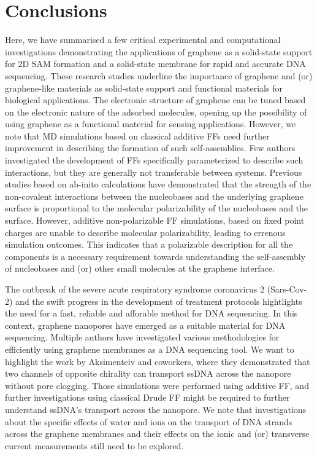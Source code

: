 \section{Conclusions}
Here, we have summarised a few critical experimental and computational investigations demonstrating the applications of graphene as a solid-state support for 2D SAM formation and a solid-state membrane for rapid and accurate DNA sequencing. These research studies underline the importance of graphene and (or) graphene-like materials as solid-state support and functional materials for biological applications. The electronic structure of graphene can be tuned based on the electronic nature of the adsorbed molecules, opening up the possibility of using graphene as a functional material for sensing applications. However, we note that MD simulations based on classical additive FFs need further improvement in describing the formation of such self-assemblies\supercite{saikia_hierarchical_2017,saikia_dynamics_2018}. Few authors investigated the development of FFs specifically parameterized to describe such interactions, but they are generally not transferable between systems\supercite{manukyan_first_2015}. Previous studies based on ab-inito calculations have demonstrated that the strength of the non-covalent interactions between the nucleobases and the underlying graphene surface is proportional to the molecular polarizability of the nucleobases and the surface.\supercite{gowtham_physisorption_2007} However, additive non-polarizable FF simulations, based on fixed point charges are unable to describe molecular polarizability, leading to errenous simulation outcomes. This indicates that a polarizable description for all the components is a necessary requirement towards understanding the self-assembly of nucleobases and (or) other small molecules at the graphene interface.  

The outbreak of the severe acute respiratory syndrome coronavirus 2 (Sars-Cov-2) and the swift progress in the development of treatment protocols hightlights the need for a fast, reliable and afforable method for DNA sequencing. In this context, graphene nanopores have emerged as a suitable material for DNA sequencing. Multiple authors have investigated various methodologies for efficiently using graphene membranes as a DNA sequencing tool. We want to highlight the work by Aksimenteiv and coworkers, where they demonstrated that two channels of opposite chirality can transport ssDNA across the nanopore without pore clogging\supercite{shankla_step-defect_2019}. Those simulations were performed using additive FF, and further investigations using classical Drude FF might be required to further understand ssDNA's transport across the nanopore. We note that investigations about the specific effects of water and ions on the transport of DNA strands across the graphene membranes and their effects on the ionic and (or) transverse current measurements still need to be explored.

